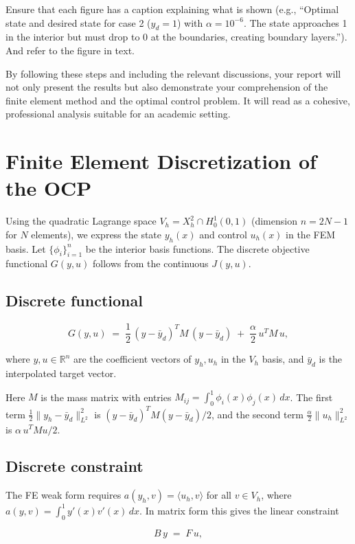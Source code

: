 Ensure that each figure has a caption explaining what is shown (e.g., “Optimal state and desired state for case 2 (\(y_d=1\)) with \(\alpha=10^{-6}\). The state approaches 1 in the interior but must drop to 0 at the boundaries, creating boundary layers.”). And refer to the figure in text.

By following these steps and including the relevant discussions, your report will not only present the results but also demonstrate your comprehension of the finite element method and the optimal control problem. It will read as a cohesive, professional analysis suitable for an academic setting.


\section{Finite Element Discretization of the OCP}
Using the quadratic Lagrange space \(V_h = X_h^2 \cap H^1_0(0,1)\) (dimension \(n=2N-1\) for \(N\) elements), we express the state \(y_h(x)\) and control \(u_h(x)\) in the FEM basis.
Let \(\{\phi_i\}_{i=1}^n\) be the interior basis functions. The discrete objective functional \(G(y,u)\) follows from the continuous \(J(y,u)\).

\subsection{Discrete functional}

\[
	G(y,u) \;=\; \frac{1}{2}\,(y - \bar y_d)^T M\, (y - \bar y_d)\;+\;\frac{\alpha}{2}\,u^T M\,u,
\]

where \(y, u \in \mathbb{R}^n\) are the coefficient vectors of \(y_h, u_h\) in the \(V_h\) basis, and \(\bar y_d\) is the interpolated target vector.

Here \(M\) is the mass matrix with entries \(M_{ij}=\int_0^1 \phi_i(x)\phi_j(x)\,dx\). The first term \(\frac{1}{2}\|y_h - \bar y_d\|_{L^2}^2\) is \((y-\bar y_d)^T M (y-\bar y_d)/2\), and the second term \(\frac{\alpha}{2}\|u_h\|_{L^2}^2\) is \(\alpha\,u^T M u/2\).

\subsection{Discrete constraint}

The FE weak form requires \(a(y_h,v) = \langle u_h,v\rangle\) for all \(v\in V_h\), where \(a(y,v)=\int_0^1 y'(x)v'(x)\,dx\). In matrix form this gives the linear constraint

\[
	B\,y \;=\; F\,u,
\]

